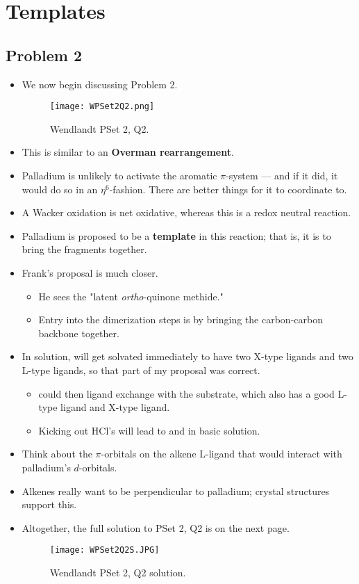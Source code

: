 \documentclass[../notes.tex]{subfiles}
\begin{document}
\chapter{Templates}
\section{Problem 2}
\begin{itemize}
    \item {}We now begin discussing Problem 2.
    \begin{figure}[h!]
        \centering
        \texttt{[image: WPSet2Q2.png]}
        \caption{Wendlandt PSet 2, Q2.}
        \label{fig:WPSet2Q2}
    \end{figure}
    \item This is similar to an \textbf{Overman rearrangement}.
    \item Palladium is unlikely to activate the aromatic $\pi$-system --- and if it did, it would do so in an $\eta^6$-fashion. There are better things for it to coordinate to.
    \item A Wacker oxidation is net oxidative, whereas this is a redox neutral reaction.
    \item Palladium is proposed to be a \textbf{template} in this reaction; that is, it is to bring the fragments together.
    \item Frank's proposal is much closer.
    \begin{itemize}
        \item He sees the "latent \emph{ortho}-quinone methide."
        \item Entry into the dimerization steps is by bringing the carbon-carbon backbone together.
    \end{itemize}
    \item In solution,  will get solvated immediately to have two X-type ligands and two L-type ligands, so that part of my proposal was correct.
    \begin{itemize}
        \item {} could then ligand exchange with the substrate, which also has a good L-type ligand and X-type ligand.
        \item Kicking out HCl's will lead to  and  in basic solution.
    \end{itemize}
    \item Think about the $\pi$-orbitals on the alkene L-ligand that would interact with palladium's $d$-orbitals.
    \item Alkenes really want to be perpendicular to palladium; crystal structures support this.
    \item Altogether, the full solution to PSet 2, Q2 is on the next page.
    \begin{figure}[h!]
        \centering
        \texttt{[image: WPSet2Q2S.JPG]}
        \caption{Wendlandt PSet 2, Q2 solution.}
        \label{fig:WPSet2Q2S}
    \end{figure}
\end{itemize}
\end{document}
